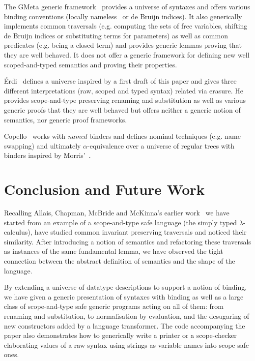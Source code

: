 {The GMeta generic framework~\citeyear{gmeta} provides a universe of syntaxes
and offers various binding conventions (locally nameless~\cite{Chargueraud2012}
or de Bruijn indices). It also generically implements common traversals (e.g. computing
the sets of free variables,
shifting
de Bruijn indices or substituting terms for parameters) as well as common
predicates (e.g. being a closed term) and provides generic lemmas proving that
they are well behaved. It does not offer a generic framework
for defining new well scoped-and-typed semantics and proving their properties.

Érdi~\citeyear{gergodraft} defines a universe inspired by a first draft of this
paper and gives three different interpretations (raw, scoped and typed syntax)
related via erasure. He provides scope-and-type
preserving renaming and substitution as well as various generic proofs that
they are well behaved but offers neither a generic notion of semantics, nor
generic proof frameworks.

Copello~\citeyear{copello2017} works with \emph{named} binders and
defines nominal techniques (e.g. name swapping) and ultimately $\alpha$-equivalence
over a universe of regular trees with binders inspired by Morris'~\citeyear{morris-regulartt}.




\section{Conclusion and Future Work}

Recalling Allais, Chapman, McBride and McKinna's earlier work~\citeyear{allais2017type}
we have started from an example
of a scope-and-type safe language (the simply typed $\lambda$-calculus), have studied
common invariant preserving traversals and noticed their similarity.
After introducing a notion of semantics and refactoring these traversals as
instances of the same fundamental lemma, we have observed the tight
connection between the abstract definition of semantics and the shape of the
language.

By extending a universe of datatype descriptions to support a notion of binding,
we have given a generic presentation of syntaxes with binding as well
as a large class of scope-and-type safe generic programs acting on all of them:
from renaming and substitution, to normalisation by evaluation, and the desugaring
of new constructors added by a language transformer. The code accompanying the
paper also demonstrates how to generically write a printer or a scope-checker
elaborating values of a raw syntax using strings as variable names into scope-safe
ones.

}
